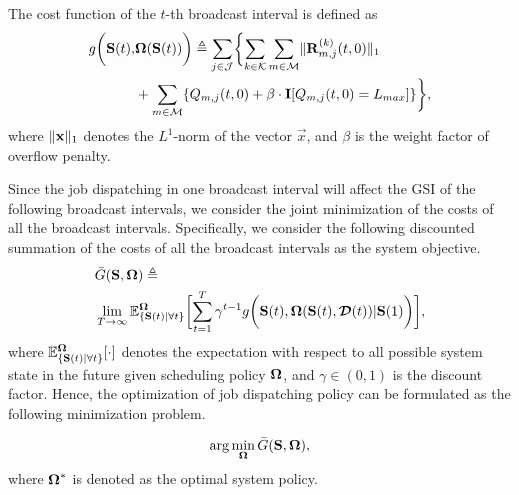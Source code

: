 \begin{definition}
    The cost function of the $t$-th broadcast interval is defined as
    \begin{align}
        g\Paren{\Stat(t),& \Policy(\Stat(t))} \define
            \sum_{j\in\jSpace} \Brace{
                \sum_{k\in\apSet} \sum_{m\in\esSet} \Inorm{\vec{R}^{(k)}_{m,j}(t,0)}
                \nonumber\\
                &+ \sum_{m\in\esSet} \{ Q_{m,j}(t,0) + \beta \cdot \mat{I}[Q_{m,j}(t,0)=L_{max}] \}
            },
    \end{align}
    where $\lVert\mathbf{x}\|_1$ denotes the $L^1$-norm of the vector $\vec{x}$, and $\beta$ is the weight factor of overflow penalty.
\end{definition}

Since the job dispatching in one broadcast interval will affect the GSI of the following broadcast intervals, we consider the joint minimization of the costs of all the broadcast intervals.
Specifically, we consider the following discounted summation of the costs of all the broadcast intervals as the system objective.
\begin{align}
    &\bar{G}(\Stat, \Policy) \define
    \nonumber\\
    & \lim_{T \to \infty} \mathbb{E}^{\Policy}_{\set{\Stat(t)|\forall t}}
    \Bracket{
        \sum_{t=1}^{T} \gamma^{t-1} g\Paren{
            \Stat(t), \Policy(\Stat(t), \Delay(t)) | \Stat(1)
        }
    },
\end{align}
where $\mathbb{E}^{\boldsymbol{\Omega}}_{\{\mathbf{S}(t)|\forall t\}}[\cdot]$ denotes the expectation with respect to all possible system state in the future given scheduling policy $\boldsymbol{\Omega}$, and $\gamma \in (0,1)$ is the discount factor.
Hence, the optimization of job dispatching policy can be formulated as the following minimization problem.

\begin{problem}
    \begin{align}
        \arg\min_{\boldsymbol{\Omega}} \bar{G}(\mathbf{S}, \boldsymbol{\Omega}),
    \end{align}
    where $\boldsymbol{\Omega}^{*}$ is denoted as the optimal system policy.
    \label{problem_1}
\end{problem}

